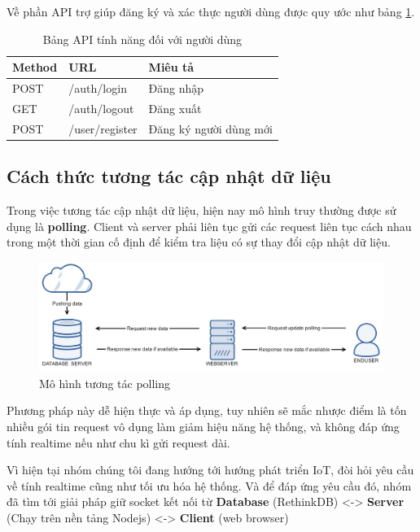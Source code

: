Về phần API trợ giúp đăng ký và xác thực người dùng được quy ước như bảng \ref{table: apiuser}.
\begin{table}[H]
	\centering
	\caption{Bảng API tính năng đối với người dùng}
	\begin{tabular}{|l|l|l|}
		\hline
		Method & URL            & Miêu tả                \\ \hline
		POST   & /auth/login       & Đăng nhập                           \\ \hline
		GET   & /auth/logout   & Đăng xuất   \\ \hline
		POST   & /user/register     & Đăng ký người dùng mới \\ \hline
	\end{tabular}
	\label{table: apiuser}
\end{table}
\subsection{Cách thức tương tác cập nhật dữ liệu}

Trong việc tương tác cập nhật dữ liệu, hiện nay mô hình truy thường được sử dụng là \textbf{polling}. Client và server phải liên tục gửi các request liên tục cách nhau trong một thời gian cố định để kiểm tra liệu có sự thay đổi cập nhật dữ liệu. 
\begin{figure}[H]
	\centering    
	\includegraphics[width=1.0\textwidth]{polling}
	\caption[Mô hình tương tác polling]{Mô hình tương tác polling}
	\label{fig: polling}
\end{figure}
Phương pháp này dễ hiện thực và áp dụng, tuy nhiên sẽ mắc nhược điểm là tốn nhiều gói tin request vô dụng làm giảm hiệu năng hệ thống, và không đáp ứng tính realtime nếu như chu kì gửi request dài.



Vì hiện tại nhóm chúng tôi đang hướng tới hướng phát triển IoT, đòi hỏi yêu cầu về tính realtime cũng như tối ưu hóa hệ thống. Và để đáp ứng yêu cầu đó, nhóm đã tìm tới giải pháp giữ socket kết nối từ \textbf{Database} (RethinkDB) <-> \textbf{Server} (Chạy trên nền tảng Nodejs) <-> \textbf{Client} (web browser)

